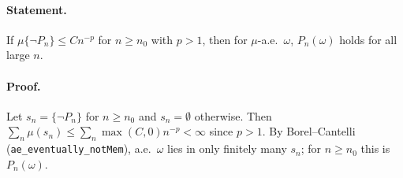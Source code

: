 \paragraph{Statement.} If $\mu\{\neg P_n\}\leq Cn^{-p}$ for $n\geq n_0$ with $p>1$, then for $\mu$-a.e.\ $\omega$, $P_n(\omega)$ holds for all large $n$.
\paragraph{Proof.} Let $s_n=\{\neg P_n\}$ for $n\geq n_0$ and $s_n=\emptyset$ otherwise. Then $\sum_n\mu(s_n)\leq\sum_n\max(C,0)n^{-p}<\infty$ since $p>1$. By
Borel--Cantelli (\texttt{ae\_eventually\_notMem}), a.e.\ $\omega$ lies in only finitely many $s_n$; for $n\geq n_0$ this is $P_n(\omega)$.
